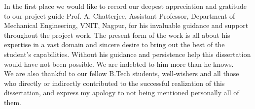 In the first place we would like to record our deepest appreciation and gratitude to our project guide Prof. A. Chatterjee, Assistant Professor, Department of Mechanical Engineering, VNIT, Nagpur, for his invaluable guidance and support throughout the project work. The present form of the work is all about his expertise in a vast domain and sincere desire to bring out the best of the student’s capabilities. Without his guidance and persistence help this dissertation would have not been possible. We are indebted to him more than he knows.\\[0.5cm]
We are also thankful to our fellow B.Tech students, well-wishers and all those who directly or indirectly contributed to the successful realization of this dissertation, and express my apology to not being mentioned personally all of them.\\[0.5cm]
%
